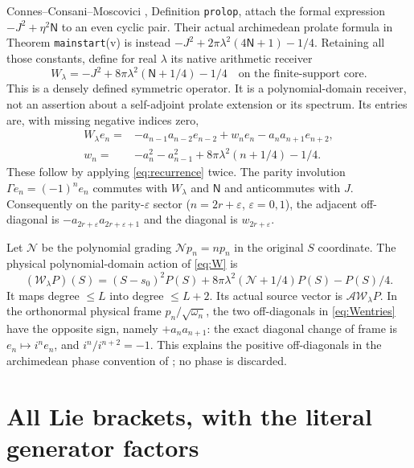 \documentclass[11pt]{article}
\begin{document}
Connes--Consani--Moscovici \cite{CCM}, Definition
\texttt{prolop}, attach the formal expression $-J^2+\eta^2\mathsf N$
to an even cyclic pair. Their actual archimedean prolate
formula in Theorem \texttt{mainstart}(v) is instead
$-J^2+2\pi\lambda^2(4\mathsf N+1)-1/4$.
Retaining all those constants, define for real $\lambda$
its native arithmetic receiver
\begin{equation}\label{eq:W}
 W_\lambda=-J^2+8\pi\lambda^2(\mathsf N+1/4)-1/4
 \quad\text{on the finite-support core}.
\end{equation}
This is a densely defined symmetric operator.
It is a polynomial-domain receiver, not an assertion about
a self-adjoint prolate extension or its spectrum.
Its entries are, with missing negative indices zero,
\begin{equation}\label{eq:Wentries}
 \begin{split}
 W_\lambda e_n={}&-a_{n-1}a_{n-2}e_{n-2}
  +w_ne_n-a_na_{n+1}e_{n+2},\\
 w_n={}&-a_n^2-a_{n-1}^2+8\pi\lambda^2(n+1/4)-1/4.
 \end{split}
\end{equation}
These follow by applying \eqref{eq:recurrence} twice.
The parity involution $\Gamma e_n=(-1)^ne_n$ commutes with
$W_\lambda$ and $\mathsf N$ and anticommutes with $J$.
Consequently on the parity-$\varepsilon$ sector
($n=2r+\varepsilon$, $\varepsilon=0,1$), the adjacent off-diagonal
is $-a_{2r+\varepsilon}a_{2r+\varepsilon+1}$ and the
diagonal is $w_{2r+\varepsilon}$.

Let $\mathcal N$ be the polynomial grading
$\mathcal Np_n=np_n$ in the original $S$ coordinate.
The physical polynomial-domain action of \eqref{eq:W} is
\begin{equation}\label{eq:Wphysical}
 (\mathcal W_\lambda P)(S)
 =(S-s_0)^2P(S)+8\pi\lambda^2(\mathcal N+1/4)P(S)-P(S)/4.
\end{equation}
It maps degree $\leq L$ into degree $\leq L+2$.
Its actual source vector is $\mathcal A\mathcal W_\lambda P$.
In the orthonormal physical frame $p_n/\sqrt{\omega_n}$,
the two off-diagonals in \eqref{eq:Wentries} have the opposite
sign, namely $+a_na_{n+1}$: the exact diagonal change of
frame is $e_n\mapsto i^ne_n$, and $i^{n}/i^{n+2}=-1$.
This explains the positive off-diagonals in the archimedean
phase convention of \cite{CCM}; no phase is discarded.

\section{All Lie brackets, with the literal generator factors}
\end{document}
